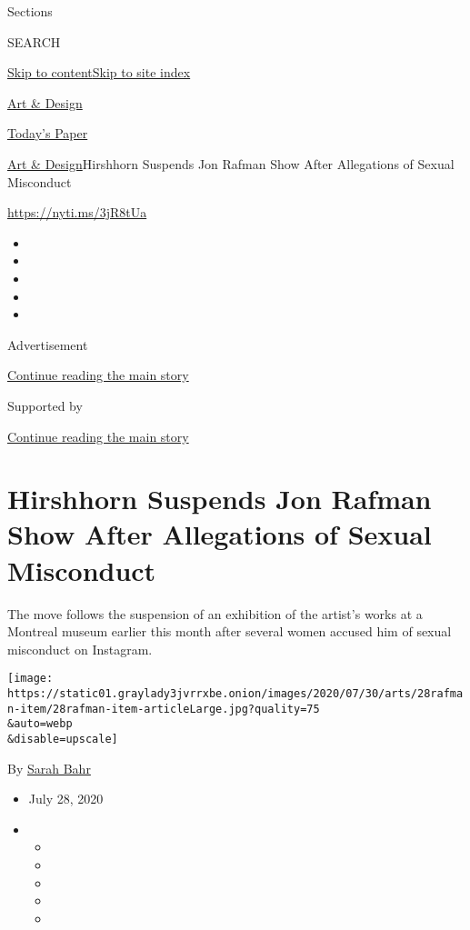 Sections

SEARCH

\protect\hyperlink{site-content}{Skip to
content}\protect\hyperlink{site-index}{Skip to site index}

\href{https://www.nytimes3xbfgragh.onion/section/arts/design}{Art \&
Design}

\href{https://myaccount.nytimes3xbfgragh.onion/auth/login?response_type=cookie\&client_id=vi}{}

\href{https://www.nytimes3xbfgragh.onion/section/todayspaper}{Today's
Paper}

\href{/section/arts/design}{Art \& Design}\textbar{}Hirshhorn Suspends
Jon Rafman Show After Allegations of Sexual Misconduct

\url{https://nyti.ms/3jR8tUa}

\begin{itemize}
\item
\item
\item
\item
\item
\end{itemize}

Advertisement

\protect\hyperlink{after-top}{Continue reading the main story}

Supported by

\protect\hyperlink{after-sponsor}{Continue reading the main story}

\hypertarget{hirshhorn-suspends-jon-rafman-show-after-allegations-of-sexual-misconduct}{%
\section{Hirshhorn Suspends Jon Rafman Show After Allegations of Sexual
Misconduct}\label{hirshhorn-suspends-jon-rafman-show-after-allegations-of-sexual-misconduct}}

The move follows the suspension of an exhibition of the artist's works
at a Montreal museum earlier this month after several women accused him
of sexual misconduct on Instagram.

\texttt{[image: https://static01.graylady3jvrrxbe.onion/images/2020/07/30/arts/28rafman-item/28rafman-item-articleLarge.jpg?quality=75\\\&auto=webp\\\&disable=upscale]}

By \href{https://www.nytimes3xbfgragh.onion/by/sarah-bahr}{Sarah Bahr}

\begin{itemize}
\item
  July 28, 2020
\item
  \begin{itemize}
  \item
  \item
  \item
  \item
  \item
  \end{itemize}
\end{itemize}


